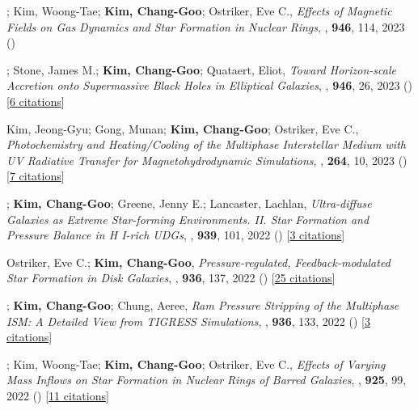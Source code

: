 \item[{30.}]; Kim, Woong-Tae; \textbf{Kim, Chang-Goo}; Ostriker, Eve C., \textit{Effects of Magnetic Fields on Gas Dynamics and Star Formation in Nuclear Rings}, , \textbf{946}, 114, 2023 ()

\item[{29.}]; Stone, James M.; \textbf{Kim, Chang-Goo}; Quataert, Eliot, \textit{Toward Horizon-scale Accretion onto Supermassive Black Holes in Elliptical Galaxies}, , \textbf{946}, 26, 2023 () [\href{http://adsabs.harvard.edu/abs/2023ApJ...946...26G}{6 citations}]

\item[{28.}]Kim, Jeong-Gyu; Gong, Munan; \textbf{Kim, Chang-Goo}; Ostriker, Eve C., \textit{Photochemistry and Heating/Cooling of the Multiphase Interstellar Medium with UV Radiative Transfer for Magnetohydrodynamic Simulations}, , \textbf{264}, 10, 2023 () [\href{http://adsabs.harvard.edu/abs/2023ApJS..264...10K}{7 citations}]

\item[{27.}]; \textbf{Kim, Chang-Goo}; Greene, Jenny E.; Lancaster, Lachlan, \textit{Ultra-diffuse Galaxies as Extreme Star-forming Environments. II. Star Formation and Pressure Balance in H I-rich UDGs}, , \textbf{939}, 101, 2022 () [\href{http://adsabs.harvard.edu/abs/2022ApJ...939..101K}{3 citations}]

\item[{26.}]Ostriker, Eve C.; \textbf{Kim, Chang-Goo}, \textit{Pressure-regulated, Feedback-modulated Star Formation in Disk Galaxies}, , \textbf{936}, 137, 2022 () [\href{http://adsabs.harvard.edu/abs/2022ApJ...936..137O}{25 citations}]

\item[{25.}]; \textbf{Kim, Chang-Goo}; Chung, Aeree, \textit{Ram Pressure Stripping of the Multiphase ISM: A Detailed View from TIGRESS Simulations}, , \textbf{936}, 133, 2022 () [\href{http://adsabs.harvard.edu/abs/2022ApJ...936..133C}{3 citations}]

\item[{24.}]; Kim, Woong-Tae; \textbf{Kim, Chang-Goo}; Ostriker, Eve C., \textit{Effects of Varying Mass Inflows on Star Formation in Nuclear Rings of Barred Galaxies}, , \textbf{925}, 99, 2022 () [\href{http://adsabs.harvard.edu/abs/2022ApJ...925...99M}{11 citations}]

